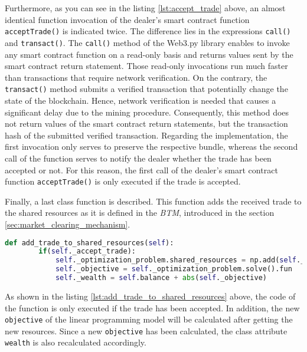 Furthermore, as you can see in the listing \ref{lst:accept_trade} above, an almost identical function invocation of the dealer's smart contract 
function \verb|acceptTrade()| is indicated twice. 
The difference lies in the expressions \verb|call()| and \verb|transact()|. 
The \verb|call()| method of the Web3.py library enables to invoke any smart contract function on a read-only basis
and returns values sent by the smart contract return statement. 
Those read-only invocations run much faster than transactions that require network verification.
On the contrary, the \verb|transact()| method submits a verified transaction that potentially change the state 
of the blockchain. 
Hence, network verification is needed that causes a significant delay due to the mining procedure.
Consequently, this method does not return values of the smart contract return statements,
but the transaction hash of the submitted verified transaction.
Regarding the implementation, the first invocation only serves to preserve the respective bundle,
whereas the second call of the function serves to notify the dealer whether the trade has been accepted or not.
For this reason, the first call of the dealer's smart contract 
function \verb|acceptTrade()| is only executed if the trade is accepted. 

Finally, a last class function is described. This function adds the received trade to the shared resources
as it is defined in the \textit{BTM}, introduced in the section \ref{sec:market_clearing_mechanism}.

\begin{lstlisting}[float=htbp, label=lst:add_trade_to_shared_resources, caption=Adding of trade to shared resources, language=Python]
    def add_trade_to_shared_resources(self):
        if(self._accept_trade):
            self._optimization_problem.shared_resources = np.add(self._optimization_problem.shared_resources, self._trade)
            self._objective = self._optimization_problem.solve().fun  
            self._wealth = self.balance + abs(self._objective)
\end{lstlisting}

As shown in the listing \ref{lst:add_trade_to_shared_resources} above, the code of the function 
is only executed if the trade has been accepted. 
In addition, the new \verb|objective| of the linear programming model will be calculated after getting the new resources.
Since a new \verb|objective| has been calculated, the class attribute \verb|wealth| is also recalculated accordingly.



